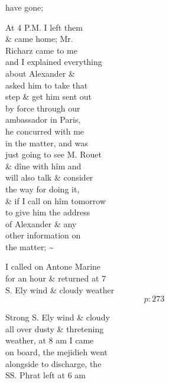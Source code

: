 \documentclass{report}
\begin{document}
	\par{
 	have gone;\ \\
	}

	\par{
 	At 4 P.M. I left them\ \\\& came home; Mr.\ \\Richarz came to me\ \\and I explained everything\ \\about Alexander \&\ \\asked him to take that\ \\step \& get him sent out\ \\by force through our\ \\ambassador in Paris,\ \\he concurred with me\ \\in the matter, and was\ \\just going to see M. Rouet\ \\\& dîne with hîm and\ \\will also talk \& consider\ \\the way for doing it,\ \\\& if I call on hîm tomorrow\ \\to give him the address\ \\of Alexander \& any\ \\other information on\ \\the matter; \~{}\ \\
	}

	\par{
 	I called on Antone Marine\ \\for an hour \& returned at 7\ \\S. Ely wind \& cloudy weather\ \\
  \[p: 273 \]

	}



	\par{
 	Strong S. Ely wind \& cloudy\ \\all over dusty \& thretening\ \\weather, at 8 am I came\ \\on board, the mejidieh went\ \\alongside to discharge, the\ \\SS. Phrat left at 6 am\ \\
	}
\end{document}
